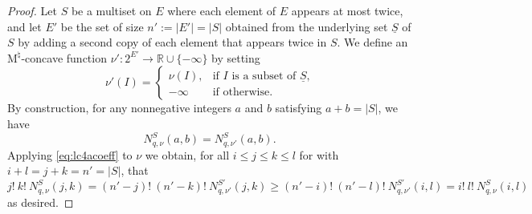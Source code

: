 \documentclass{amsart}
\theoremstyle{definition}
\theoremstyle{remark}
\newcommand{\abs}[1]{\left|#1\right|}               %
\newcommand{\1}{\mathbf{1}}
\newcommand{\Mnat}{$\text{M}^\natural$}
\numberwithin{equation}{section}
\begin{document}
\begin{proof}
Let $S$ be a multiset on $E$ where each element of $E$ appears at most twice, and let $E'$ be the set of size
$n' := \abs{E'} = \abs{S}$
obtained from the underlying set $\underline{S}$ of $S$ by adding a second copy of each element that appears twice in $S$.
We define an \Mnat-concave function $\nu':2^{E'} \to \mathbb{R} \cup \{-\infty\}$ by setting
\[
\nu'(I)=\begin{cases} \nu(I), &\text{if $I$ is a subset of $\underline{S}$,}  \\ -\infty& \text{if otherwise.} \end{cases}
\]
By construction, for any nonnegative integers $a$ and $b$ satisfying $a+b=\abs{S}$, we have
\[
N^S_{q,\nu}(a,b)=N^S_{q,\nu'}(a,b).
\]
Applying \eqref{eq:lc4acoeff} to $\nu$ we obtain,   for all $i\leq j\leq k\leq l$ for with  $i+l=j+k=n'=\abs{S}$, that
  \[
   j!\ k!\ N^S_{q,\nu}(j,k)=(n'-j)!\ (n'-k)!\ N^{S'}_{q,\nu'}(j,k)  \ge (n'-i)!\ (n'-l)!\ N^{S'}_{q,\nu'}(i,l) = i!\ l!\ N^S_{q,\nu}(i,l)
  \]
as desired.  
\end{proof}




%
\small
\end{document}

